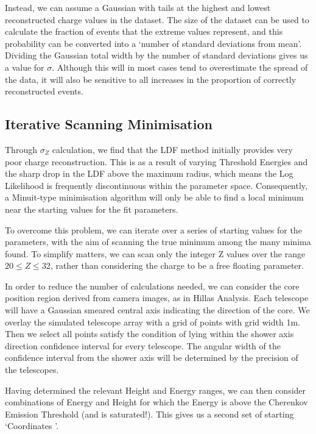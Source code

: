 \documentclass{article}
\begin{document}
Instead, we can assume a Gaussian with tails at the highest and lowest reconstructed charge values in the dataset. The size of the dataset can be used to calculate the fraction of events that the extreme values represent, and this probability can be converted into a \textquoteleft number of standard deviations from mean'. Dividing the Gaussian total width by the number of standard deviations gives us a value for $\sigma$. Although this will in most cases tend to overestimate the spread of the data, it will also be sensitive to all increases in the proportion of correctly reconstructed events.

\subsection{Iterative Scanning Minimisation}
Through $\sigma_{Z}$ calculation, we find that the LDF method initially provides very poor charge reconstruction. This is as a result of varying Threshold Energies and the sharp drop in the LDF above the maximum radius, which means the Log Likelihood is frequently discontinuous within the parameter space. Consequently, a Minuit-type minimisation algorithm will only be able to find a local minimum near the starting values for the fit parameters.

To overcome this problem, we can iterate over a series of starting values for the parameters, with the aim of scanning the true minimum among the many minima found. To simplify matters, we can scan only the integer Z values over the range $ 20 \leq Z \leq 32 $, rather than considering the charge to be a free floating parameter.

In order to reduce the number of calculations needed, we can consider the core position region derived from camera images, as in Hillas Analysis. Each telescope will have a Gaussian smeared central axis indicating the direction of the core. We overlay the simulated telescope array with a grid of points with grid width 1m. Then we select all points satisfy the condition of lying within the shower axis direction confidence interval for every telescope. The angular width of the confidence interval from the shower axis will be determined by the precision of the telescopes.

Having determined the relevant Height and Energy ranges, we can then consider combinations of Energy and Height for which the Energy is above the Cherenkov Emission Threshold (and is saturated!). This gives us a second set of starting \textquoteleft Coordinates \textquoteright.
\end{document}
